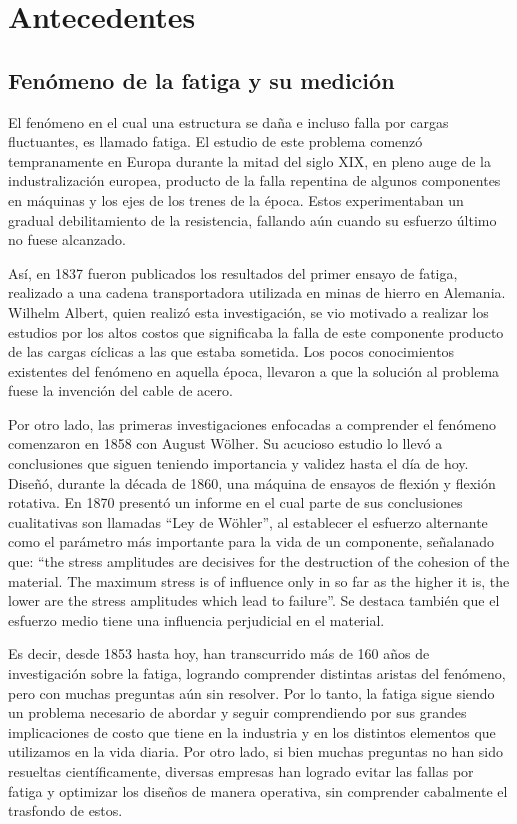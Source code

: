 \chapter{Antecedentes}

\section{Fenómeno de la fatiga y su medición}
El fenómeno en el cual una estructura se daña e incluso falla por cargas fluctuantes, es llamado fatiga. El estudio de este problema comenzó tempranamente en Europa durante la mitad del siglo XIX, en pleno auge de la industralización europea, producto de la falla repentina de algunos componentes en máquinas y los ejes de los trenes de la época. Estos experimentaban un gradual debilitamiento de la resistencia, fallando aún cuando su esfuerzo último no fuese alcanzado. 

Así, en 1837 fueron publicados los resultados del primer ensayo de fatiga, realizado a una cadena transportadora utilizada en minas de hierro en Alemania. Wilhelm Albert, quien realizó esta investigación, se vio motivado a realizar los estudios por los altos costos que significaba la falla de este componente producto de las cargas cíclicas a las que estaba sometida. Los pocos conocimientos existentes del fenómeno en aquella época, llevaron a que la solución al problema fuese la invención del cable de acero.

Por otro lado, las primeras investigaciones enfocadas a comprender el fenómeno comenzaron en 1858 con August Wölher. Su acucioso estudio lo llevó a conclusiones que siguen teniendo importancia y validez hasta el día de hoy. Diseñó, durante la década de 1860, una máquina de ensayos de flexión y flexión rotativa. En 1870 presentó un informe en el cual parte de sus conclusiones cualitativas son llamadas ``Ley de Wöhler'', al establecer el esfuerzo alternante como el parámetro más importante para la vida de un componente, señalanado que: ``the stress amplitudes are decisives for the destruction of the cohesion of the material. The maximum stress is of influence only in so far as the higher it is, the lower are the stress amplitudes which lead to failure''\cite{schutz1996history}. Se destaca también que el esfuerzo medio tiene una influencia perjudicial en el material. 

Es decir, desde 1853 hasta hoy, han transcurrido más de 160 años de investigación sobre la fatiga, logrando comprender distintas aristas del fenómeno, pero con muchas preguntas aún sin resolver. Por lo tanto, la fatiga sigue siendo un problema necesario de abordar y seguir comprendiendo por sus grandes implicaciones de costo que tiene en la industria y en los distintos elementos que utilizamos en la vida diaria. Por otro lado, si bien muchas preguntas no han sido resueltas científicamente, diversas empresas han logrado evitar las fallas por fatiga y optimizar los diseños de manera operativa, sin comprender cabalmente el trasfondo de estos.

